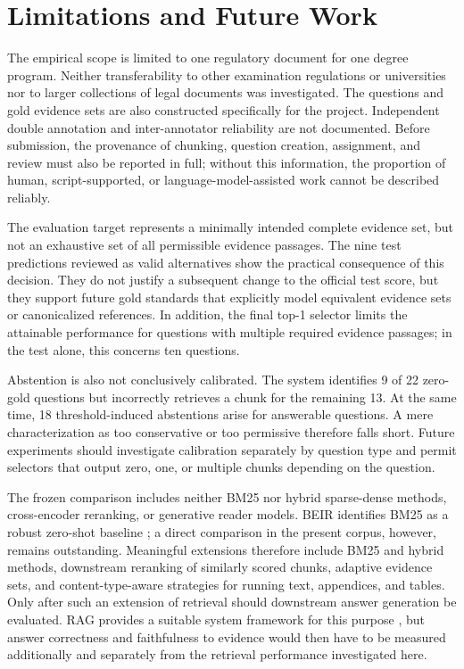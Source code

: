 \documentclass[11pt]{article}
\begin{document}
\section{Limitations and Future Work}

The empirical scope is limited to one regulatory document for one degree program. Neither transferability to other examination regulations or universities nor to larger collections of legal documents was investigated. The questions and gold evidence sets are also constructed specifically for the project. Independent double annotation and inter-annotator reliability are not documented. Before submission, the provenance of chunking, question creation, assignment, and review must also be reported in full; without this information, the proportion of human, script-supported, or language-model-assisted work cannot be described reliably.

The evaluation target represents a minimally intended complete evidence set, but not an exhaustive set of all permissible evidence passages. The nine test predictions reviewed as valid alternatives show the practical consequence of this decision. They do not justify a subsequent change to the official test score, but they support future gold standards that explicitly model equivalent evidence sets or canonicalized references. In addition, the final top-1 selector limits the attainable performance for questions with multiple required evidence passages; in the test alone, this concerns ten questions.

Abstention is also not conclusively calibrated. The system identifies 9 of 22 zero-gold questions but incorrectly retrieves a chunk for the remaining 13. At the same time, 18 threshold-induced abstentions arise for answerable questions. A mere characterization as too conservative or too permissive therefore falls short. Future experiments should investigate calibration separately by question type and permit selectors that output zero, one, or multiple chunks depending on the question.

The frozen comparison includes neither BM25 nor hybrid sparse-dense methods, cross-encoder reranking, or generative reader models. BEIR identifies BM25 as a robust zero-shot baseline \citep{thakur2021beir}; a direct comparison in the present corpus, however, remains outstanding. Meaningful extensions therefore include BM25 and hybrid methods, downstream reranking of similarly scored chunks, adaptive evidence sets, and content-type-aware strategies for running text, appendices, and tables. Only after such an extension of retrieval should downstream answer generation be evaluated. RAG provides a suitable system framework for this purpose \citep{lewis2020rag}, but answer correctness and faithfulness to evidence would then have to be measured additionally and separately from the retrieval performance investigated here.


\end{document}
